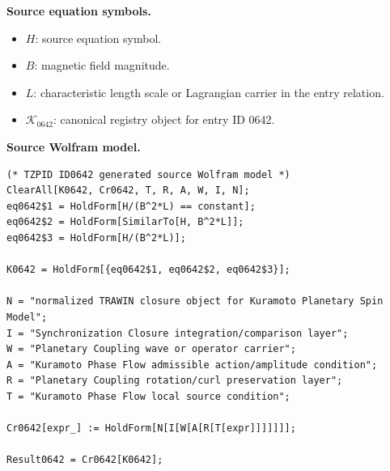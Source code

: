 \begin{minipage}[t]{0.49\linewidth}
\begingroup
\small
\raggedright
\textbf{Source equation symbols.}\par
\begin{itemize}[leftmargin=1.35em,itemsep=1pt,topsep=1pt,parsep=0pt]
    \item $H$: source equation symbol.
    \item $B$: magnetic field magnitude.
    \item $L$: characteristic length scale or Lagrangian carrier in the entry relation.
    \item $\mathcal{K}_{0642}$: canonical registry object for entry ID 0642.
\end{itemize}
\endgroup
\end{minipage}\hfill
\begin{minipage}[t]{0.47\linewidth}
\begingroup
\scriptsize
\raggedright
\textbf{Source Wolfram model.}\par
\begin{Verbatim}[fontsize=\tiny,breaklines=true,breakanywhere=true]
(* TZPID ID0642 generated source Wolfram model *)
ClearAll[K0642, Cr0642, T, R, A, W, I, N];
eq0642$1 = HoldForm[H/(B^2*L) == constant];
eq0642$2 = HoldForm[SimilarTo[H, B^2*L]];
eq0642$3 = HoldForm[H/(B^2*L)];

K0642 = HoldForm[{eq0642$1, eq0642$2, eq0642$3}];

N = "normalized TRAWIN closure object for Kuramoto Planetary Spin Model";
I = "Synchronization Closure integration/comparison layer";
W = "Planetary Coupling wave or operator carrier";
A = "Kuramoto Phase Flow admissible action/amplitude condition";
R = "Planetary Coupling rotation/curl preservation layer";
T = "Kuramoto Phase Flow local source condition";

Cr0642[expr_] := HoldForm[N[I[W[A[R[T[expr]]]]]]];

Result0642 = Cr0642[K0642];
\end{Verbatim}
\endgroup
\end{minipage}

